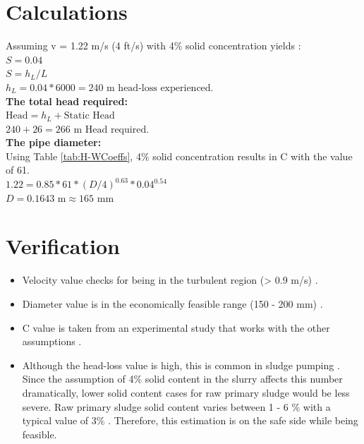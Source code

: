 \documentclass[a4paper]{article}
\begin{document}
\section*{Calculations}
Assuming v = 1.22 m/s (4 ft/s) with 4\% solid concentration yields \autocite{sanin2011}:\\
$S = 0.04$\\
$S = h_L/L$\\
$h_L = 0.04*6000 = 240 \text{ m head-loss experienced.}$\\
\textbf{The total head required:}\\
$\text{Head} = h_L + \text{Static Head}$\\
$240 + 26 = \boxed{266 \text{ m}} \text{ Head required.}$\\
\textbf{The pipe diameter:}\\
Using Table \ref{tab:H-WCoeffs}, 4\% solid concentration results in C with the value of 61.\\
$1.22=0.85*61*(D/4)^{0.63}*0.04^{0.54}$\\
$D = 0.1643 \text{ m} \approx \boxed{165 \text{ mm}}$
\section*{Verification}
\begin{itemize}
    \item Velocity value checks for being in the turbulent region (> 0.9 m/s) \autocite{sanin2011, metcalf2014}.
    \item Diameter value is in the economically feasible range (150 - 200 mm) \autocite{sanin2011, vesilind1988, metcalf2014}.
    \item C value is taken from an experimental study that works with the other assumptions \autocite{brisbin1957}.
    \item Although the head-loss value is high, this is common in sludge pumping \autocite{sanin2011}. Since the assumption of 4\% solid content in the slurry affects this number dramatically, lower solid content cases for raw primary sludge would be less severe. Raw primary sludge solid content varies between 1 - 6 \% with a typical value of 3\% \autocite{metcalf2014}. Therefore, this estimation is on the safe side while being feasible.
\end{itemize}
\printbibliography
\end{document}
